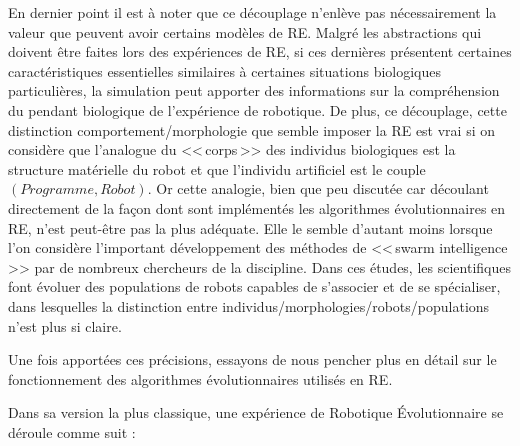 En dernier point il est à noter que ce découplage n'enlève pas nécessairement la valeur que peuvent avoir certains modèles de RE. Malgré les abstractions  qui doivent être faites lors des expériences de RE, si ces dernières présentent certaines caractéristiques essentielles similaires à certaines situations biologiques particulières, la simulation peut apporter des informations sur la compréhension du pendant biologique de l'expérience de robotique. De plus, ce découplage, cette distinction comportement/morphologie que semble imposer la RE est vrai si on considère que l'analogue du <<\,corps\,>> des individus biologiques est la structure matérielle du robot et que l'individu artificiel est le couple $(Programme,Robot)$. Or cette analogie, bien que peu discutée car découlant directement de la façon dont sont implémentés les algorithmes évolutionnaires en RE, n'est peut-être pas la plus adéquate. Elle le semble d'autant moins lorsque l'on considère l'important développement des méthodes de <<\,swarm intelligence\,>> par de nombreux chercheurs de la discipline. Dans ces études, les scientifiques font évoluer des populations de robots capables de s'associer et de se spécialiser, dans lesquelles la distinction entre individus/morphologies/robots/populations n'est plus si claire.

Une fois apportées ces précisions, essayons de nous pencher plus en détail sur le fonctionnement des algorithmes évolutionnaires utilisés en RE.

Dans sa version la plus classique, une expérience de Robotique \'Evolutionnaire se déroule comme suit \citep[pour certains exemples historiques de la littératures]{nolfi96learning,floreano94automaticcreationofanautonomousagen,jakobi97evolutionaryroboticsandtheradicalenvelopeofnoisehypothesis}:

